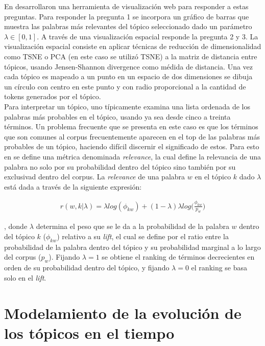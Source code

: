\documentclass[letterpaper,12pt,oneside]{book} %
\begin{document}
En \citep{sievert2014ldavis} desarrollaron una herramienta de visualización web para responder a estas preguntas. Para responder la pregunta 1 se incorpora un gráfico de barras que muestra las palabras más relevantes del tópico seleccionado dado un parámetro $\lambda \in [0,1]$. A través de una visualización espacial responde la pregunta 2 y 3. La visualización espacial consiste en aplicar técnicas de reducción de dimensionalidad como TSNE \citep{maaten2008visualizing} o PCA \citep{wold1987principal} (en este caso se utilizó TSNE) a la matriz de distancia entre tópicos, usando Jensen-Shannon divergence \citep{endres2003new} como médida de distancia. Una vez cada tópico es mapeado a un punto en un espacio de dos dimensiones se dibuja un círculo con centro en este punto y con radio proporcional a la cantidad de tokens generados por el tópico.\\

Para interpretar un tópico, uno típicamente examina una lista ordenada de los palabras más probables en el tópico, usando ya sea desde cinco a treinta términos. Un problema frecuente que se presenta en este caso es que los términos que son comunes al corpus frecuentemente aparecen en el top de las palabras más probables de un tópico, haciendo difícil discernir el significado de estos.
Para esto en \citep{sievert2014ldavis} se define una métrica denominada \textit{relevance}, la cual define la relevancia de una palabra no solo por su probabilidad dentro del tópico sino también por su exclusivad dentro del corpus. La \textit{relevance} de una palabra $w$ en el tópico $k$ dado $\lambda$ está dada a través de la siguiente expresión:

\begin{align}
    r(w,k|\lambda) = \lambda log (\phi_{kw})+ (1-\lambda)\lambda log\bigg(\frac{\phi_{kw}}{p_{w}}\bigg)
\end{align}

, donde $\lambda$ determina el peso que se le da a la probabilidad de la palabra $w$ dentro del tópico $k$ ($\phi_{kw}$) relativo a su \textit{lift}, el cual se define por el ratio entre la probabilidad de la palabra dentro del tópico y su probabilidad marginal a lo largo del corpus ($p_w$). Fijando $\lambda=1$ se obtiene el ranking de términos decrecientes en orden de su probabilidad dentro del tópico, y fijando $\lambda=0$ el ranking se basa solo en el \textit{lift}.

\section{Modelamiento de la evolución de los tópicos en el tiempo}
\end{document}
